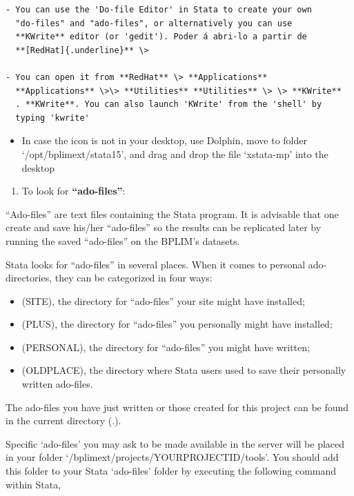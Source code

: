 \documentclass[]{book}
\providecommand{\tightlist}{%
  \setlength{\itemsep}{0pt}\setlength{\parskip}{0pt}}
\begin{document}
\begin{verbatim}
- You can use the 'Do-file Editor' in Stata to create your own
  "do-files" and "ado-files", or alternatively you can use
  **KWrite** editor (or 'gedit'). Poder á abri-lo a partir de
  **[RedHat]{.underline}** \>

- You can open it from **RedHat** \> **Applications**
  **Applications** \>\> **Utilities** **Utilities** \> \> **KWrite**
  . **KWrite**. You can also launch 'KWrite' from the 'shell' by
  typing 'kwrite'
\end{verbatim}

\begin{itemize}
\tightlist
\item
  In case the icon is not in your desktop, use Dolphin, move to folder
  `/opt/bplimext/stata15', and drag and drop the file `xstata-mp' into
  the desktop
\end{itemize}

\begin{enumerate}
\def\labelenumi{\arabic{enumi}.}
\setcounter{enumi}{1}
\tightlist
\item
  To look for \textbf{``ado-files''}:
\end{enumerate}

``Ado-files'' are text files containing the Stata program. It is
advisable that one create and save his/her ``ado-files'' so the results
can be replicated later by running the saved ``ado-files'' on the
BPLIM's datasets.

Stata looks for ``ado-files'' in several places. When it comes to
personal ado-directories, they can be categorized in four ways:

\begin{itemize}
\item
  (SITE), the directory for ``ado-files'' your site might have
  installed;
\item
  (PLUS), the directory for ``ado-files'' you personally might have
  installed;
\item
  (PERSONAL), the directory for ``ado-files'' you might have written;
\item
  (OLDPLACE), the directory where Stata users used to save their
  personally written ado-files.
\end{itemize}

The ado-files you have just written or those created for this project
can be found in the current directory (.).

Specific `ado-files' you may ask to be made available in the server
will be placed in your folder
`/bplimext/projects/YOURPROJECTID/tools'. You should add this folder
to your Stata `ado-files' folder by executing the following command
within Stata,
\end{document}
